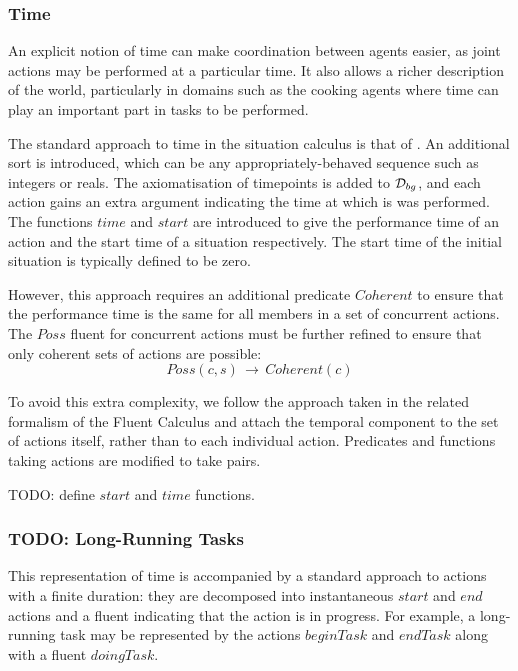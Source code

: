 \subsubsection{Time}

An explicit notion of time can make coordination between agents easier,
as joint actions may be performed at a particular time. It also allows
a richer description of the world, particularly in domains such as
the cooking agents where time can play an important part in tasks
to be performed.

The standard approach to time in the situation calculus is that of
\citep{pinto94temporal,reiter96sc_nat_conc}. An additional sort 
is introduced, which can be any appropriately-behaved sequence such
as integers or reals. The axiomatisation of timepoints is added to
$\mathcal{D}_{bg}$, and each action gains an extra argument indicating the
time at which is was performed. The functions $time$ and $start$
are introduced to give the performance time of an action and the start
time of a situation respectively. The start time of the initial situation
is typically defined to be zero.

However, this approach requires an additional predicate $Coherent$
to ensure that the performance time is the same for all members in
a set of concurrent actions. The $Poss$ fluent for concurrent actions
must be further refined to ensure that only coherent sets of actions
are possible:\[
Poss(c,s)\,\rightarrow\, Coherent(c)\]


To avoid this extra complexity, we follow the approach taken in the
related formalism of the Fluent Calculus \citep{martin03conc_flux}
and attach the temporal component to the set of actions itself, rather
than to each individual action. Predicates and functions taking actions
are modified to take pairs.

TODO: define $start$ and $time$ functions.


\subsubsection{TODO: Long-Running Tasks}

This representation of time is accompanied by a standard approach
to actions with a finite duration: they are decomposed into instantaneous
$start$ and $end$ actions and a fluent indicating that the action
is in progress. For example, a long-running task may be represented
by the actions $beginTask$ and $endTask$ along with a fluent $doingTask$.

